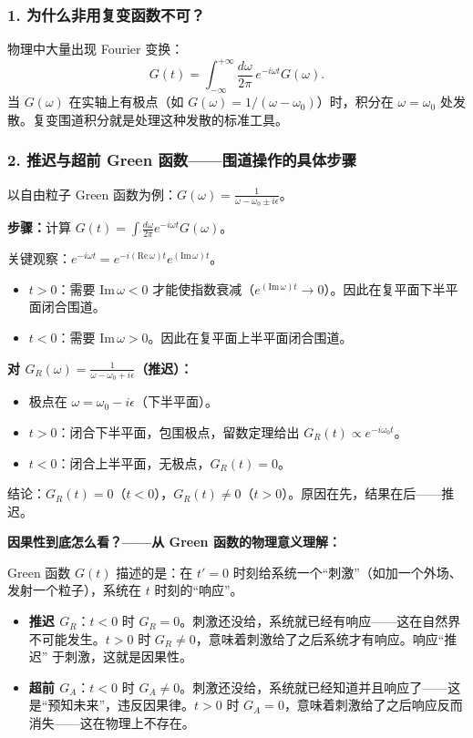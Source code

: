 \begin{derivationbox}

\subsubsection*{1. 为什么非用复变函数不可？}

物理中大量出现 Fourier 变换：
\[
G(t) = \int_{-\infty}^{+\infty} \frac{d\omega}{2\pi} \, e^{-i\omega t} G(\omega).
\]
当 $G(\omega)$ 在实轴上有极点（如 $G(\omega) = 1/(\omega-\omega_0)$）时，积分在 $\omega = \omega_0$ 处发散。复变围道积分就是处理这种发散的标准工具。

\subsubsection*{2. 推迟与超前 Green 函数——围道操作的具体步骤}

以自由粒子 Green 函数为例：$G(\omega) = \frac{1}{\omega - \omega_0 \pm i\epsilon}$。

\textbf{步骤：}计算 $G(t) = \int \frac{d\omega}{2\pi} e^{-i\omega t} G(\omega)$。

关键观察：$e^{-i\omega t} = e^{-i(\text{Re}\,\omega)t} e^{(\text{Im}\,\omega)t}$。
\begin{itemize}
    \item $t > 0$：需要 $\text{Im}\,\omega < 0$ 才能使指数衰减（$e^{(\text{Im}\,\omega)t} \to 0$）。因此在复平面下半平面闭合围道。
    \item $t < 0$：需要 $\text{Im}\,\omega > 0$。因此在复平面上半平面闭合围道。
\end{itemize}

\textbf{对 $G_R(\omega) = \frac{1}{\omega - \omega_0 + i\epsilon}$（推迟）：}
\begin{itemize}
    \item 极点在 $\omega = \omega_0 - i\epsilon$（下半平面）。
    \item $t > 0$：闭合下半平面，包围极点，留数定理给出 $G_R(t) \propto e^{-i\omega_0 t}$。
    \item $t < 0$：闭合上半平面，无极点，$G_R(t) = 0$。
\end{itemize}
结论：$G_R(t) = 0$（$t < 0$），$G_R(t) \neq 0$（$t > 0$）。原因在先，结果在后——推迟。

\textbf{因果性到底怎么看？——从 Green 函数的物理意义理解：}

Green 函数 $G(t)$ 描述的是：在 $t' = 0$ 时刻给系统一个``刺激''（如加一个外场、发射一个粒子），系统在 $t$ 时刻的``响应''。
\begin{itemize}
    \item \textbf{推迟 $G_R$}：$t < 0$ 时 $G_R = 0$。刺激还没给，系统就已经有响应——这在自然界不可能发生。$t > 0$ 时 $G_R \neq 0$，意味着刺激给了之后系统才有响应。响应``推迟'' 于刺激，这就是因果性。
    \item \textbf{超前 $G_A$}：$t < 0$ 时 $G_A \neq 0$。刺激还没给，系统就已经知道并且响应了——这是``预知未来''，违反因果律。$t > 0$ 时 $G_A = 0$，意味着刺激给了之后响应反而消失——这在物理上不存在。
\end{itemize}


\end{derivationbox}
